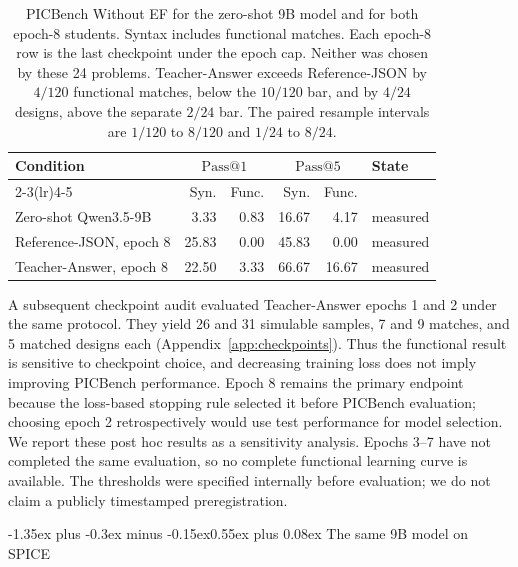 \documentclass[11pt]{article}
\makeatletter
\renewcommand\section{\@startsection{section}{1}{\z@}%
  {-1.35ex plus -0.3ex minus -0.15ex}{0.55ex plus 0.08ex}%
  {\normalfont\large\bfseries}}
\newcommand{\passk}[1]{\mathrm{Pass@}#1}
\makeatother
\begin{document}
\begin{table}[H]
\caption{PICBench Without EF for the zero-shot 9B model and for both epoch-8 students.
Syntax includes functional matches.
Each epoch-8 row is the last checkpoint under the epoch cap.
Neither was chosen by these 24 problems.
Teacher-Answer exceeds Reference-JSON by $4/120$ functional matches, below the $10/120$ bar, and by $4/24$ designs, above the separate $2/24$ bar.
The paired resample intervals are $1/120$ to $8/120$ and $1/24$ to $8/24$.}
\label{tab:prereg}
\begin{center}
\begin{small}
\begin{tabular}{lrrrrl}
\toprule
Condition & \multicolumn{2}{c}{$\passk{1}$} & \multicolumn{2}{c}{$\passk{5}$} & State \\
\cmidrule(lr){2-3}\cmidrule(lr){4-5}
 & Syn. & Func. & Syn. & Func. & \\
\midrule
Zero-shot Qwen3.5-9B & 3.33 & 0.83 & 16.67 & 4.17 & measured \\
Reference-JSON, epoch 8 & 25.83 & 0.00 & 45.83 & 0.00 & measured \\
Teacher-Answer, epoch 8 & 22.50 & 3.33 & 66.67 & 16.67 & measured \\
\bottomrule
\end{tabular}
\end{small}
\end{center}
\end{table}

A subsequent checkpoint audit evaluated Teacher-Answer epochs 1 and 2 under the same protocol. They yield 26 and 31 simulable samples, 7 and 9 matches, and 5 matched designs each (Appendix~\ref{app:checkpoints}). Thus the functional result is sensitive to checkpoint choice, and decreasing training loss does not imply improving PICBench performance. Epoch 8 remains the primary endpoint because the loss-based stopping rule selected it before PICBench evaluation; choosing epoch 2 retrospectively would use test performance for model selection. We report these post hoc results as a sensitivity analysis. Epochs 3--7 have not completed the same evaluation, so no complete functional learning curve is available. The thresholds were specified internally before evaluation; we do not claim a publicly timestamped preregistration.

\section{The same 9B model on SPICE}
\label{sec:spice}
\end{document}
